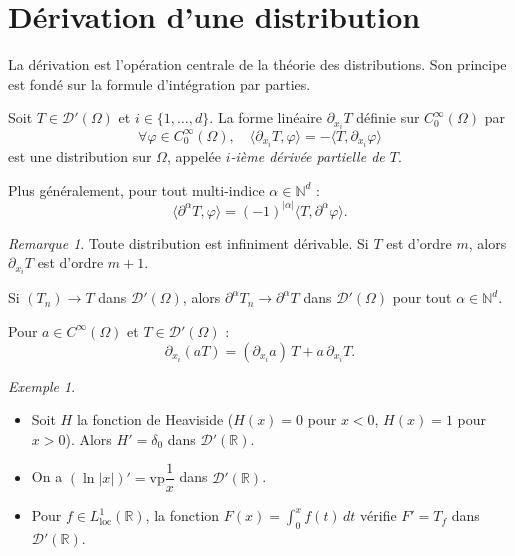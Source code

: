 \documentclass[12pt,a4paper,openany]{book}
\theoremstyle{definition}
\theoremstyle{plain}
\theoremstyle{remark}
\newtheorem*{remark}{Remarque}
\newtheorem*{example}{Exemple}
\newenvironment{remarque}{\begin{remark}}{\end{remark}}
\newenvironment{exemple}{\begin{example}}{\end{example}}
\begin{document}
	\section{Dérivation d'une distribution}
	
	La dérivation est l'opération centrale de la théorie des distributions. Son principe est fondé sur la formule d'intégration par parties.
	
	\begin{definition}
		Soit $T \in \mathcal{D}'(\Omega)$ et $i \in \{1, \ldots, d\}$. La forme linéaire $\partial_{x_i} T$ définie sur $C_0^\infty(\Omega)$ par
		\[
		\forall \varphi \in C_0^\infty(\Omega), \quad \langle \partial_{x_i} T, \varphi \rangle = -\langle T, \partial_{x_i} \varphi \rangle
		\]
		est une distribution sur $\Omega$, appelée \emph{$i$-ième dérivée partielle de $T$}.
		
		Plus généralement, pour tout multi-indice $\alpha \in \mathbb{N}^d$ :
		\[
		\langle \partial^\alpha T, \varphi \rangle = (-1)^{|\alpha|} \langle T, \partial^\alpha \varphi \rangle.
		\]
	\end{definition}
	
	\begin{remarque}
		Toute distribution est infiniment dérivable. Si $T$ est d'ordre $m$, alors $\partial_{x_i} T$ est d'ordre $m+1$.
	\end{remarque}
	
	\begin{proposition}
		Si $(T_n) \to T$ dans $\mathcal{D}'(\Omega)$, alors $\partial^\alpha T_n \to \partial^\alpha T$ dans $\mathcal{D}'(\Omega)$ pour tout $\alpha \in \mathbb{N}^d$.
	\end{proposition}
	
	\begin{proposition}
		Pour $a \in C^\infty(\Omega)$ et $T \in \mathcal{D}'(\Omega)$ :
		\[
		\partial_{x_i}(aT) = (\partial_{x_i} a)\,T + a\,\partial_{x_i} T.
		\]
	\end{proposition}
	
	\begin{exemple}
		\begin{itemize}
			\item Soit $H$ la fonction de Heaviside ($H(x) = 0$ pour $x < 0$, $H(x) = 1$ pour $x > 0$). Alors $H' = \delta_0$ dans $\mathcal{D}'(\mathbb{R})$.
			\item On a $(\ln|x|)' = \mathrm{vp}\dfrac{1}{x}$ dans $\mathcal{D}'(\mathbb{R})$.
			\item Pour $f \in L^1_{\mathrm{loc}}(\mathbb{R})$, la fonction $F(x) = \int_0^x f(t)\,dt$ vérifie $F' = T_f$ dans $\mathcal{D}'(\mathbb{R})$.
		\end{itemize}
	\end{exemple}
	
\end{document}
